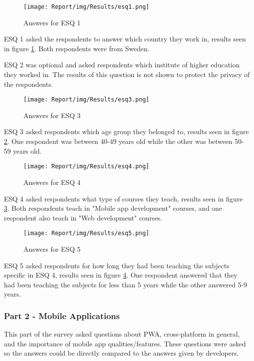 \documentclass[a4paper,12pt]{article}
\begin{document}
\begin{figure}[ht!]
    \centering
    \texttt{[image: Report/img/Results/esq1.png]}
    \caption{Answers for ESQ 1}
    \label{fig:res_eduq1}
\end{figure}
\newpage
ESQ 1 asked the respondents to answer which country they work in, results seen in figure \ref{fig:res_eduq1}. Both respondents were from Sweden.

ESQ 2 was optional and asked respondents which institute of higher education they worked in. The results of this question is not shown to protect the privacy of the respondents.

\begin{figure}[ht!]
    \centering
    \texttt{[image: Report/img/Results/esq3.png]}
    \caption{Answers for ESQ 3}
    \label{fig:res_eduq3}
\end{figure}

ESQ 3 asked respondents which age group they belonged to, results seen in figure \ref{fig:res_eduq3}. One respondent was between 40-49 years old while the other was between 50-59 years old.
\newpage

\begin{figure}[ht!]
    \centering
    \texttt{[image: Report/img/Results/esq4.png]}
    \caption{Answers for ESQ 4}
    \label{fig:res_eduq4}
\end{figure}

ESQ 4 asked respondents what type of courses they teach, results seen in figure \ref{fig:res_eduq4}. Both respondents teach in "Mobile app development" courses, and one respondent also teach in "Web development" courses.

\begin{figure}[ht!]
    \centering
    \texttt{[image: Report/img/Results/esq5.png]}
    \caption{Answers for ESQ 5}
    \label{fig:res_eduq5}
\end{figure}

ESQ 5 asked respondents for how long they had been teaching the subjects specific in ESQ 4, results seen in figure \ref{fig:res_eduq5}. One respondent answered that they had been teaching the subjects for less than 5 years while the other answered 5-9 years.

\subsubsection{Part 2 - Mobile Applications}
This part of the survey asked questions about PWA, cross-platform in general, and the importance of mobile app qualities/features. These questions were asked so the answers could be directly compared to the answers given by developers.
\end{document}
